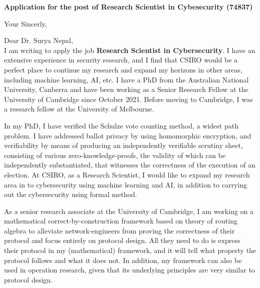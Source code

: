 \documentclass[11pt,a4paper,roman]{moderncv}
\begin{document}
\date{\today}
\opening{\textbf{Application for the post of Research Scientist in Cybesecurity (74837)}}
\closing{Your Sincerly, \vspace{-1em}}



\makelettertitle



Dear Dr. Surya Nepal, 
\\
\vspace{1em}
I am writing to apply
the job \textbf{Research Scientist in Cybersecurity}. I have an extensive experience in
security research, and I find that CSIRO would be a perfect place to continue 
my research and expand my horizons in other areas, including machine 
learning, AI, etc.  I have a PhD from the Australian National University, Canberra
and have been working as a Senior Research Fellow at the University of 
Cambridge since October 2021. Before moving to Cambridge, I was a 
research fellow at the University of Melbourne. 

\vspace{0.5cm}
In my PhD, I have verified the Schulze vote counting method, a
 widest path problem. I have addressed ballot privacy by using
 homomorphic encryption, and verifiability by means of producing an
 independently verifiable scrutiny sheet, consisting of various zero-knowledge-proofs, 
 the validity of which can
 be independently substantiated, that witnesses the correctness of the
 execution of an election. At CSIRO, as a Research Scientist, 
 I would like to expand my research area  
 in to cybersecurity using machine learning and AI, in addition to carrying 
 out the cybersecurity using formal method.
 
 

\vspace{0.5cm}
As a senior research associate at the University of Cambridge, 
I am working on  
a mathematical correct-by-construction framework based on theory of routing algebra 
to alleviate network-engineers from proving the 
correctness of their protocol and focus entirely on protocol design.
All  they need to do is express their protocol in my (mathematical) 
framework, and it will 
tell what property the protocol follows and what it does not. 
In addition, my framework can also be used in operation
research, given that its underlying principles are very similar to protocol design.
\end{document}
